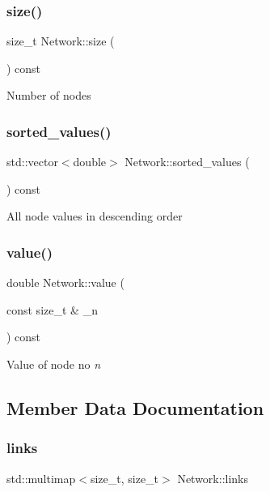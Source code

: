 \subsubsection{\texorpdfstring{size()}{size()}}
{\footnotesize\ttfamily size\+\_\+t Network\+::size (\begin{DoxyParamCaption}{ }\end{DoxyParamCaption}) const}

Number of nodes \mbox{\label{classNetwork_a07ae19f51e2440a711ced30b1f371197}} 
\subsubsection{\texorpdfstring{sorted\+\_\+values()}{sorted\_values()}}
{\footnotesize\ttfamily std\+::vector$<$double$>$ Network\+::sorted\+\_\+values (\begin{DoxyParamCaption}{ }\end{DoxyParamCaption}) const}

All node values in descending order \mbox{\label{classNetwork_a9b9cb94c0af24ce5417d840727fb5ad3}} 
\subsubsection{\texorpdfstring{value()}{value()}}
{\footnotesize\ttfamily double Network\+::value (\begin{DoxyParamCaption}\item[{const size\+\_\+t \&}]{\+\_\+n }\end{DoxyParamCaption}) const}

Value of node no {\itshape n} 

\subsection{Member Data Documentation}
\mbox{\label{classNetwork_a1b5fbd7815319e330841dbd961d9f8cc}} 
\subsubsection{\texorpdfstring{links}{links}}
{\footnotesize\ttfamily std\+::multimap$<$size\+\_\+t, size\+\_\+t$>$ Network\+::links\hspace{0.3cm}{\ttfamily [private]}}

